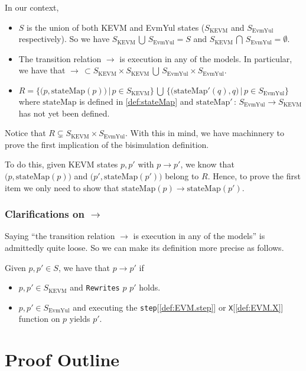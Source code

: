 In our context,
\begin{itemize}
\item $S$ is the union of both KEVM and EvmYul states ($S_{\text{KEVM}}$ and
  $S_{\text{EvmYul}}$ respectively). So we have $S_{\text{KEVM}}\, \bigcup\, S_{\text{EvmYul}} = S$ and $S_{\text{KEVM}}\, \bigcap\, S_{\text{EvmYul}} = \emptyset$.
\item The transition relation $\rightarrow$ is execution in any of the models. In particular, we have that $\rightarrow\,
\subset S_{\text{KEVM}} \times S_{\text{KEVM}} \,\bigcup\, S_{\text{EvmYul}} \times S_{\text{EvmYul}}$.
\item $R = \bigl\{\bigl( p, \text{stateMap}(p) \bigr)\, |\, p\in S_{\text{KEVM}}\bigr\} \,\bigcup\, \bigl\{\bigl(\text{stateMap}'(q),
  q\bigr)\, |\, p\in S_{\text{EvmYul}}\bigr\}$ where $\text{stateMap}$ is
  defined in \ref{def:stateMap} and $\text{stateMap}'\,:\,
  S_{\text{EvmYul}}\rightarrow S_{\text{KEVM}}$ has not yet been defined.

\end{itemize}
Notice that $R \subsetneq S_{\text{KEVM}}\times S_{\text{EvmYul}}$.
With this in mind, we have machinnery to prove the first implication of the
bisimulation definition.

To do this, given KEVM states $p, p'$ with $p \rightarrow p'$, we know that
$\bigl( p, \text{stateMap}(p) \bigr)$ and $\bigl( p', \text{stateMap}(p')
\bigr)$ belong to $R$. Hence, to prove the first item we only need to show that
$\text{stateMap}(p) \rightarrow \text{stateMap}(p')$.

\subsubsection{Clarifications on $\rightarrow$}

Saying ``the transition relation $\rightarrow$ is execution in any of the
models'' is admittedly quite loose. So we can make its definition more precise
as follows.

\begin{definition}
Given $p, p' \in S$, we have that $p\rightarrow p'$ if
\begin{itemize}
\item $p, p'\in S_{\text{KEVM}}$ and \texttt{Rewrites} $p$ $p'$ holds.
\item $p, p'\in S_{\text{EvmYul}}$ and executing the
  \texttt{step}[\ref{def:EVM.step}] or \texttt{X}[\ref{def:EVM.X}] function on $p$ yields $p'$.
\end{itemize}
\end{definition}

\section{Proof Outline}


